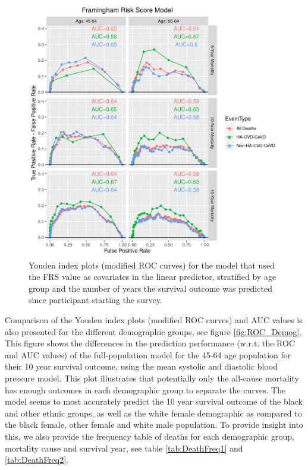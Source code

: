 \documentclass[
]{article}
\begin{document}
\begin{figure}
\centering
\includegraphics{./Rmarkdown_Plots/ROC_FRSModel_CAx-EventType.png}
\caption{Youden index plots (modified ROC curves) for the model that used the FRS value as covariates in the linear predictor, stratified by age group and the number of years the survival outcome was predicted since participant starting the survey.}\label{fig:ROC_FRS}
\end{figure}

Comparison of the Youden index plots (modified ROC curves) and AUC values is also presented for the different demographic groups, see figure \ref{fig:ROC_Demog}. This figure shows the differences in the prediction performance (w.r.t. the ROC and AUC values) of the full-population model for the 45-64 age population for their 10 year survival outcome, using the mean systolic and diastolic blood pressure model. This plot illustrates that potentially only the all-cause mortality has enough outcomes in each demographic group to separate the curves. The model seems to most accurately predict the 10 year survival outcome of the black and other ethnic groups, as well as the white female demographic as compared to the black female, other female and white male population. To provide insight into this, we also provide the frequency table of deaths for each demographic group, mortality cause and survival year, see table \ref{tab:DeathFreq1} and \ref{tab:DeathFreq2}.
\end{document}
